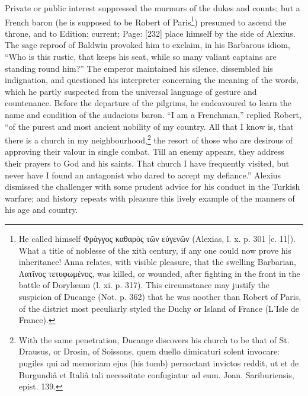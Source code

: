 Private or public interest suppressed the murmurs of the dukes and counts; but a French baron (he is supposed to be Robert of Paris\footnote{He called himself \textgreek{Φράγγος καθαρ\texthebrew{ὸ}ς τ\texthebrew{ῶ}ν ε\texthebrew{ὐ}γεν\texthebrew{ῶ}ν} (Alexias, l. x. p. 301 [c. 11]). What a title of noblesse of the xith century, if any one could now prove his inheritance! Anna relates, with visible pleasure, that the swelling Barbarian, \textgreek{Λατ\texthebrew{ῖ}νος τετυφωμένος}, was killed, or wounded, after fighting in the front in the battle of Dorylæum (l. xi. p. 317). This circumstance may justify the suspicion of Ducange (Not. p. 362) that he was noother than Robert of Paris, of the district most peculiarly styled the Duchy or Island of France (L\texthebrew{}’Isle de France).}) presumed to ascend the throne, and to Edition: current; Page: [232] place himself by the side of Alexius. The sage reproof of Baldwin provoked him to exclaim, in his Barbarous idiom, \texthebrew{“}Who is this rustic, that keeps his seat, while so many valiant captains are standing round him?\texthebrew{}” The emperor maintained his silence, dissembled his indignation, and questioned his interpreter concerning the meaning of the words, which he partly suspected from the universal language of gesture and countenance. Before the departure of the pilgrims, he endeavoured to learn the name and condition of the audacious baron. \texthebrew{“}I am a Frenchman,\texthebrew{}” replied Robert, \texthebrew{“}of the purest and most ancient nobility of my country. All that I know is, that there is a church in my neighbourhood,\footnote{With the same penetration, Ducange discovers his church to be that of St. Drausus, or Drosin, of Soissons, quem duello dimicaturi solent invocare: pugiles qui ad memoriam ejus (his tomb) pernoctant invictos reddit, ut et de Burgundiâ et Italiâ tali necessitate confugiatur ad eum. Joan. Sariburiensis, epist. 139.} the resort of those who are desirous of approving their valour in single combat. Till an enemy appears, they address their prayers to God and his saints. That church I have frequently visited, but never have I found an antagonist who dared to accept my defiance.\texthebrew{}” Alexius dismissed the challenger with some prudent advice for his conduct in the Turkish warfare; and history repeats with pleasure this lively example of the manners of his age and country.

